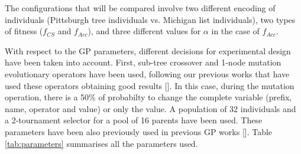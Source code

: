 The configurations that will be compared involve two different encoding of individuals (Pittsburgh tree individuals vs. Michigan list individuals), two types of fitness ($f_{CS}$ and $f_{Acc}$), and three different values for $\alpha$ in the case of $f_{Acc}$.

With respect to the GP parameters, different decisions for experimental design have been taken into account. 
First, sub-tree crossover and 1-node mutation evolutionary operators have
been used, following our previous works that have used these operators
obtaining good results [\cite{EvoStar2014:GPBot}]. In this case, during the
mutation operation, there is a 50\% of probabilty to change the complete variable (prefix, name, operator and value) or only the value. A population of 32 individuals and a 2-tournament selector for a pool of
16 parents have been used. These parameters have been also previously used in previous GP works [\cite{EvoStar2014:GPBot}]. Table \ref{tab:parameters} summarises all the parameters used.

\begin{table}
\begin{center}
\caption{Parameters used in the experiments.}
\label{tab:parameters}
\end{center}
\end{table}

